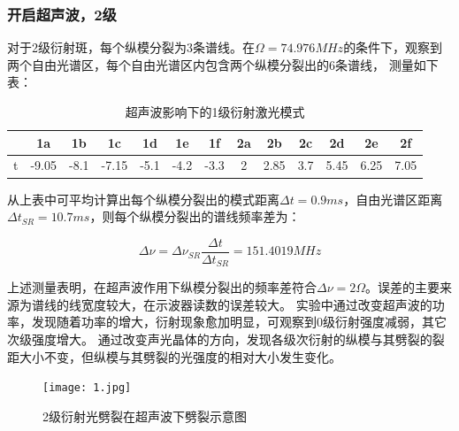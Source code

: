 \documentclass[12pt,a4paper]{article}
\newcommand{\be}[1]{
    \begin{equation}
        #1
    \end{equation}
}
\begin{document}
    \subsubsection{开启超声波，2级}
    对于2级衍射斑，每个纵模分裂为3条谱线。在$\Omega=74.976MHz$的条件下，观察到两个自由光谱区，每个自由光谱区内包含两个纵模分裂出的6条谱线，
测量如下表：
\begin{table}[H]
    \centering
    \begin{tabular}{|c|c|c|c|c|c|c|c|c|c|c|c|c|}
    \hline
      & 1a    & 1b   & 1c    & 1d   & 1e   & 1f   & 2a & 2b   & 2c  & 2d   & 2e   & 2f   \\ \hline
    t & -9.05 & -8.1 & -7.15 & -5.1 & -4.2 & -3.3 & 2  & 2.85 & 3.7 & 5.45 & 6.25 & 7.05 \\ \hline
    \end{tabular}
    \caption{超声波影响下的1级衍射激光模式}
    \end{table}
    从上表中可平均计算出每个纵模分裂出的模式距离$\Delta t=0.9ms$，自由光谱区距离$\Delta t_{SR}=10.7ms$，则每个纵模分裂出的谱线频率差为：
    \be{\Delta \nu=\Delta \nu_{SR}\frac{\Delta t}{\Delta t_{SR}}=151.4019MHz}

    上述测量表明，在超声波作用下纵模分裂出的频率差符合$\Delta \nu=2\Omega$。误差的主要来源为谱线的线宽度较大，在示波器读数的误差较大。
    实验中通过改变超声波的功率，发现随着功率的增大，衍射现象愈加明显，可观察到0级衍射强度减弱，其它次级强度增大。
    通过改变声光晶体的方向，发现各级次衍射的纵模与其劈裂的裂距大小不变，但纵模与其劈裂的光强度的相对大小发生变化。
    \begin{figure}[H]
        \centering
        \texttt{[image: 1.jpg]}
        \caption{2级衍射光劈裂在超声波下劈裂示意图}
    \end{figure}
\end{document}
